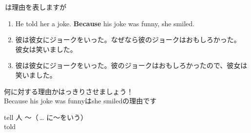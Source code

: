 \documentclass[aspectratio=169,xcolor={dvipsnames,table}]{beamer}
\begin{document}
\begin{frame}[plain]{\,は理由を表しますが}
 
\begin{enumerate}
 \item<1-> He told her a joke. \textbf{Because} his joke was funny, she smiled.
 \item<2-> 彼は彼女にジョークをいった。なぜなら彼のジョークはおもしろかった。
彼女は笑いました。
 \item<3-> 彼は彼女にジョークをいった。彼のジョークはおもしろかったので、彼女は笑いました。
 \end{enumerate}

\textdbend
何に対する理由かはっきりさせましょう！\\
\hspace*{16pt}Because his joke was funnyはshe smiledの理由です


\vspace*{40pt}

\hfill{\scriptsize tell 人 ～（\,\ldots\,\,に～をいう）}\\
\hfill{\scriptsize told }
\end{frame}
\end{document}
